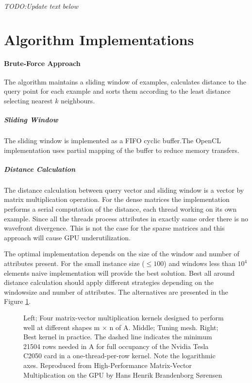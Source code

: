 \textit{TODO:Update text below}

\section*{Algorithm Implementations}
\paragraph*{Brute-Force Approach}
The algorithm maintains a sliding window of examples, calculates distance to the query point for each example and sorts them according to the least distance selecting nearest $k$ neighbours.
\subparagraph*{Sliding Window}
The sliding window is implemented as a FIFO cyclic buffer.The OpenCL
implementation uses partial mapping of the buffer to reduce memory transfers.
\subparagraph*{Distance Calculation}
The distance calculation between query vector and sliding window is a vector by matrix multiplication operation. 
For the dense matrices the implementation performs a serial computation of
the distance, each thread working on its own example. Since all the threads
process attributes in exactly same order there is no wavefront divergence. This
is not the case for the sparse matrices and this approach will cause GPU
underutilization.

The optimal implementation depends on the size of the window and number of
attributes present\cite{Sorensen2011}. For the small instance size ($ \leq 100
$) and windows less than $ 10^{4} $ elements naive implementation will provide the best
solution. Best all around distance calculation should apply different strategies
depending on the windowsize and number of attributes\cite{Sorensen2011}. The
alternatives are presented in the Figure \ref{MatrixVectorSorensen}.

\begin{figure}[htp] 
	\caption{\label{MatrixVectorSorensen} Left; Four matrix-vector multiplication
	kernels designed to perform well at different shapes m × n of A. Middle; Tuning
	mesh. Right; Best kernel in practice. The dashed line indicates the minimum
	21504 rows needed in A for full occupancy of the Nvidia Tesla C2050 card in a
	one-thread-per-row kernel. Note the logarithmic axes. Reproduced from
	High-Performance Matrix-Vector Multiplication on the GPU by Hans Henrik
	Brandenborg S{\o}rensen\cite{Sorensen2011}}
\end{figure}


